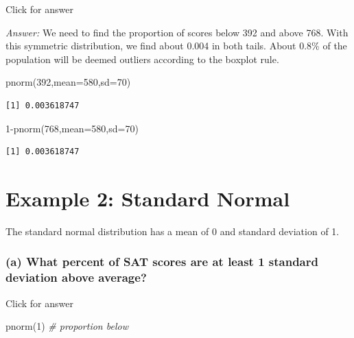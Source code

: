 \documentclass[
]{book}
\newenvironment{Shaded}{\begin{snugshade}}{\end{snugshade}}
\newcommand{\AttributeTok}[1]{\textcolor[rgb]{0.77,0.63,0.00}{#1}}
\newcommand{\CommentTok}[1]{\textcolor[rgb]{0.56,0.35,0.01}{\textit{#1}}}
\newcommand{\DecValTok}[1]{\textcolor[rgb]{0.00,0.00,0.81}{#1}}
\newcommand{\FunctionTok}[1]{\textcolor[rgb]{0.00,0.00,0.00}{#1}}
\newcommand{\NormalTok}[1]{#1}
\newcommand{\SpecialCharTok}[1]{\textcolor[rgb]{0.00,0.00,0.00}{#1}}
\begin{document}
Click for answer

\emph{Answer:} We need to find the proportion of scores below 392 and above 768. With this symmetric distribution, we find about 0.004 in both tails. About 0.8\% of the population will be deemed outliers according to the boxplot rule.

\begin{Shaded}
\begin{Highlighting}[]
\FunctionTok{pnorm}\NormalTok{(}\DecValTok{392}\NormalTok{,}\AttributeTok{mean=}\DecValTok{580}\NormalTok{,}\AttributeTok{sd=}\DecValTok{70}\NormalTok{)}
\end{Highlighting}
\end{Shaded}

\begin{verbatim}
[1] 0.003618747
\end{verbatim}

\begin{Shaded}
\begin{Highlighting}[]
\DecValTok{1}\SpecialCharTok{{-}}\FunctionTok{pnorm}\NormalTok{(}\DecValTok{768}\NormalTok{,}\AttributeTok{mean=}\DecValTok{580}\NormalTok{,}\AttributeTok{sd=}\DecValTok{70}\NormalTok{)}
\end{Highlighting}
\end{Shaded}

\begin{verbatim}
[1] 0.003618747
\end{verbatim}

\hypertarget{example-2-standard-normal}{%
\section{Example 2: Standard Normal}\label{example-2-standard-normal}}

The standard normal distribution has a mean of 0 and standard deviation of 1.

\hypertarget{a-what-percent-of-sat-scores-are-at-least-1-standard-deviation-above-average}{%
\subsubsection{(a) What percent of SAT scores are at least 1 standard deviation above average?}\label{a-what-percent-of-sat-scores-are-at-least-1-standard-deviation-above-average}}

\hfill\break

Click for answer

\begin{Shaded}
\begin{Highlighting}[]
\FunctionTok{pnorm}\NormalTok{(}\DecValTok{1}\NormalTok{)  }\CommentTok{\# proportion below}
\end{Highlighting}
\end{Shaded}
\end{document}
